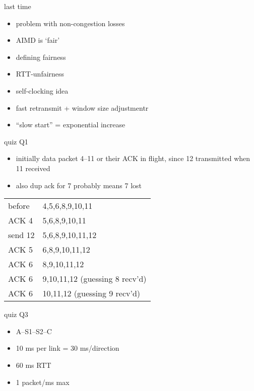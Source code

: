 \date{}
\title{}
\date{}
\usepackage{pgfplots}
\pgfplotsset{compat=1.16}

\begin{frame}
    \titlepage
\end{frame}


\begin{frame}{last time}
    \begin{itemize}
    \item problem with non-congestion losses
    \item AIMD is `fair'
    \item defining fairness
    \item RTT-unfairness
    \item self-clocking idea
    \item fast retransmit + window size adjustmentr
    \item ``slow start'' = exponential increase
    \end{itemize}
\end{frame}

\begin{frame}{quiz Q1}
\begin{itemize}
\item initially data packet 4--11 or their ACK in flight, since 12 transmitted when 11 received
\item also dup ack for 7 probably means 7 lost
\end{itemize}
\begin{tabular}{ll}
before & 4,5,6,8,9,10,11\\
ACK 4 & 5,6,8,9,10,11 \\
send 12 & 5,6,8,9,10,11,12 \\
ACK 5 & 6,8,9,10,11,12 \\
ACK 6 & 8,9,10,11,12  \\
ACK 6 & 9,10,11,12 (guessing 8 recv'd) \\
ACK 6 & 10,11,12 (guessing 9 recv'd) \\
\end{tabular}
\end{frame}

\begin{frame}{quiz Q3}
\begin{itemize}
\item A--S1--S2--C
\item 10 ms per link = 30 ms/direction
\item 60 ms RTT
\item 1 packet/ms max
\end{itemize}
\end{frame}

